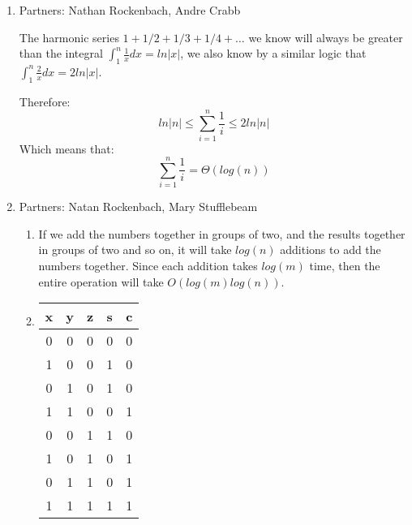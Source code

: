 \documentclass[11pt]{article}
\begin{document}
\begin{enumerate}
\begin{enumerate}
\begin{proof}
Inductive Step:
\begin{eqnarray*}
X^{n+1} &=& X^nX
\end{eqnarray*}
$X^n$ will have at most n bits, and since X contains only 1 and 0, the
multiplication part of the intermediate step will add no bits. The addition of
the two numbers that are each still at most n bits long will be at most n+1 bits
long.
\end{proof}
\item
Since there are 8 multiplications per matrix mult, and each of those
multiplications take M(n) time, the time per matrix mult is:
\begin{equation*}
8M(n)
\end{equation*}
And since we have to do $O(log(n))$ matrix mults to do fib, we now have:
\begin{equation*}
O(8M(n)log(n)) = O(M(n)log(n))
\end{equation*}
\item
\begin{eqnarray*}
O(M(n) + M(n/2) + M(n/4) + \dots) &=& O\left(n^2 + \frac{n^2}{4} +
\frac{n^2}{16}\right)\\
&=& O(2n^2) \\
&=& O(2M(n))\\
&=& O(M(n))
\end{eqnarray*}
\end{enumerate}
\newpage
\item 
Partners: Nathan Rockenbach, Andre Crabb

The harmonic series $1 + 1/2 + 1/3 + 1/4 + \dots$ we know will always be greater
than the integral $\int_1^n \frac{1}{x} dx = ln|x|$, we also know by a similar
logic that $\int_1^n \frac{2}{x}dx = 2ln|x|$.

Therefore:
\begin{equation*}
ln|n| \le \sum_{i=1}^{n} \frac{1}{i} \le 2ln|n|
\end{equation*}
Which means that:
\begin{equation*}
\sum_{i=1}^n\frac1i = \Theta(log(n))
\end{equation*}
\newpage
\item
Partners: Natan Rockenbach, Mary Stufflebeam
\begin{enumerate}
\item If we add the numbers together in groups of two, and the results together
in groups of two and so on, it will take $log(n)$ additions to add the numbers
together. Since each addition takes $log(m)$ time, then the entire operation
will take $O(log(m)log(n))$.
\item 
\begin{tabular}{|c|c|c||c|c|}
\hline
x&y&z&s&c\\
\hline
0&0&0&0&0\\
1&0&0&1&0\\
0&1&0&1&0\\
1&1&0&0&1\\
0&0&1&1&0\\
1&0&1&0&1\\
0&1&1&0&1\\
1&1&1&1&1\\
\hline
\end{tabular}


\end{enumerate}
\end{enumerate}
\end{document}
